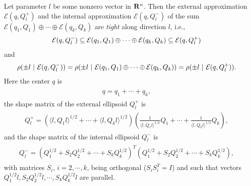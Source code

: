 \documentclass[letterpaper,10pt,english]{sphinxmanual}
\begin{document}
Let parameter \(l\) be some nonzero vector in \({\bf R}^n\).
Then the external approximation \({\mathcal E}(q,Q_l^+)\) and the
internal approximation \({\mathcal E}(q,Q_l^-)\) of the sum
\({\mathcal E}(q_1,Q_1)\oplus\cdots\oplus{\mathcal E}(q_k,Q_k)\) are
\emph{tight} along direction \(l\), i.e.,
\begin{gather}
\begin{split}{\mathcal E}(q,Q_l^-)\subseteq{\mathcal E}(q_1,Q_1)\oplus\cdots\oplus{\mathcal E}(q_k,Q_k)
\subseteq{\mathcal E}(q,Q_l^+)\end{split}\notag
\end{gather}
and
\begin{gather}
\begin{split}\rho(\pm l ~|~ {\mathcal E}(q,Q_l^-)) =
\rho(\pm l ~|~ {\mathcal E}(q_1,Q_1)\oplus\cdots\oplus{\mathcal E}(q_k,Q_k)) =
\rho(\pm l ~|~ {\mathcal E}(q,Q_l^+)).\end{split}\notag
\end{gather}
Here the center \(q\) is
\label{chap_ellcalc:equation-minksum_c}\begin{gather}
\begin{split}q = q_1 + \cdots + q_k ,\end{split}\label{chap_ellcalc-minksum_c}
\end{gather}
the shape matrix of the external ellipsoid \(Q_l^+\) is
\label{chap_ellcalc:equation-minksum_ea}\begin{gather}
\begin{split}Q_l^+ = \left(\langle l,Q_1l\rangle^{1/2} + \cdots
+ \langle l,Q_kl\rangle^{1/2}\right)
\left(\frac{1}{\langle l,Q_1l\rangle^{1/2}}Q_1 + \cdots +
\frac{1}{\langle l,Q_kl\rangle^{1/2}}Q_k\right),\end{split}\label{chap_ellcalc-minksum_ea}
\end{gather}
and the shape matrix of the internal ellipsoid \(Q_l^-\) is
\label{chap_ellcalc:equation-minksum_ia}\begin{gather}
\begin{split}Q_l^- = \left(Q_1^{1/2} + S_2Q_2^{1/2} + \cdots + S_kQ_k^{1/2}\right)^T
\left(Q_1^{1/2} + S_2Q_2^{1/2} + \cdots + S_kQ_k^{1/2}\right),\end{split}\label{chap_ellcalc-minksum_ia}
\end{gather}
with matrices \(S_i\), \(i=2,\cdots,k\), being orthogonal
(\(S_iS_i^T=I\)) and such that vectors
\(Q_1^{1/2}l, S_2Q_2^{1/2}l, \cdots, S_kQ_k^{1/2}l\) are parallel.
\end{document}
